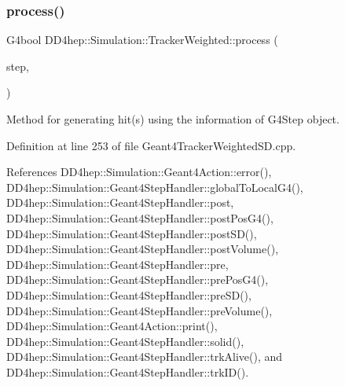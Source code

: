 \hypertarget{struct_d_d4hep_1_1_simulation_1_1_tracker_weighted_ab258cb542897a7bd369fd204eafbb245}{}\label{struct_d_d4hep_1_1_simulation_1_1_tracker_weighted_ab258cb542897a7bd369fd204eafbb245} 
\subsubsection{\texorpdfstring{process()}{process()}}
{\footnotesize\ttfamily G4bool D\+D4hep\+::\+Simulation\+::\+Tracker\+Weighted\+::process (\begin{DoxyParamCaption}\item[{const G4\+Step $\ast$}]{step,  }\item[{G4\+Touchable\+History $\ast$}]{ }\end{DoxyParamCaption})\hspace{0.3cm}{\ttfamily [inline]}}



Method for generating hit(s) using the information of G4\+Step object. 



Definition at line 253 of file Geant4\+Tracker\+Weighted\+S\+D.\+cpp.



References D\+D4hep\+::\+Simulation\+::\+Geant4\+Action\+::error(), D\+D4hep\+::\+Simulation\+::\+Geant4\+Step\+Handler\+::global\+To\+Local\+G4(), D\+D4hep\+::\+Simulation\+::\+Geant4\+Step\+Handler\+::post, D\+D4hep\+::\+Simulation\+::\+Geant4\+Step\+Handler\+::post\+Pos\+G4(), D\+D4hep\+::\+Simulation\+::\+Geant4\+Step\+Handler\+::post\+S\+D(), D\+D4hep\+::\+Simulation\+::\+Geant4\+Step\+Handler\+::post\+Volume(), D\+D4hep\+::\+Simulation\+::\+Geant4\+Step\+Handler\+::pre, D\+D4hep\+::\+Simulation\+::\+Geant4\+Step\+Handler\+::pre\+Pos\+G4(), D\+D4hep\+::\+Simulation\+::\+Geant4\+Step\+Handler\+::pre\+S\+D(), D\+D4hep\+::\+Simulation\+::\+Geant4\+Step\+Handler\+::pre\+Volume(), D\+D4hep\+::\+Simulation\+::\+Geant4\+Action\+::print(), D\+D4hep\+::\+Simulation\+::\+Geant4\+Step\+Handler\+::solid(), D\+D4hep\+::\+Simulation\+::\+Geant4\+Step\+Handler\+::trk\+Alive(), and D\+D4hep\+::\+Simulation\+::\+Geant4\+Step\+Handler\+::trk\+I\+D().

\hypertarget{struct_d_d4hep_1_1_simulation_1_1_tracker_weighted_abb50962377c010e8430400035d5e3dcf}{}\label{struct_d_d4hep_1_1_simulation_1_1_tracker_weighted_abb50962377c010e8430400035d5e3dcf} 

